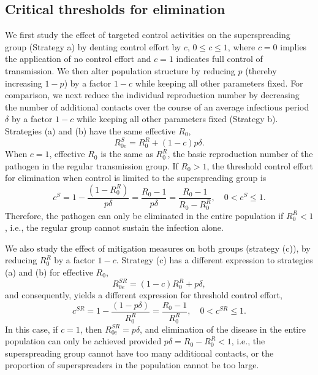 \documentclass{imammb}
\numberwithin{equation}{section}
\begin{document}
\subsection{Critical thresholds for elimination}

We first study the effect of targeted control activities on the superspreading group (Strategy a) by denting control effort by $c$, $0\leq c\leq 1$, where $c=0$ implies the application of no control effort and $c=1$ indicates full control of  transmission. We then alter population structure by reducing $p$ (thereby increasing $1-p$) by a factor $1-c$ while keeping all other parameters fixed. For comparison, we next reduce the individual reproduction number by decreasing the number of additional contacts over the course of an average infectious period $\delta$ by a factor $1-c$ while keeping all other parameters fixed (Strategy b).  Strategies (a) and (b) have the same effective $R_0$,
\begin{equation}\label{eqn:effectiveR0S}
R_{0e}^{S} = R_0^R + (1-c) p \delta.
\end{equation}
When $c=1$, effective $R_0$ is the same as $R_0^R$, the basic reproduction number of the pathogen in the regular transmission group. If $R_0 > 1$, the threshold control effort for elimination when control is limited to the superspreading group is 
\begin{equation}\label{eqn:thresholdS}
c^{S} = 1 -\frac{ (1-R_0^R)}{p \delta}    = \frac{R_0-1}{p \delta} =\frac{R_0-1}{R_0-R_0^R}, \quad 0< c^{S} \leq 1.
\end{equation}
Therefore, the pathogen can only be eliminated in the entire population if $R_0^R < 1$, i.e., the regular group cannot sustain the infection alone. 


We also study the effect of mitigation measures on both groups (strategy (c)), by reducing $R_0^R$ by a factor $1-c$. Strategy (c) has a different expression to strategies (a) and (b) for effective $R_0$,
\begin{equation}\label{eqn:effectiveR0SR}
R_{0e}^{SR} = (1-c) R_0^R + p \delta, 
\end{equation}
and consequently, yields a different expression for threshold control effort,
\begin{equation}\label{eqn:thresholdSR}
c^{SR} = 1 -\frac{ (1-p \delta)}{R_0^R} = \frac{R_0-1}{R_0^R}, \quad 0 < c^{SR} \leq 1.
\end{equation}
In this case, if $c=1$, then $R_{0e}^{SR} = p \delta$, and elimination of the disease in the entire population can only be achieved provided $p \delta = R_0 - R_0^R < 1$, i.e., the superspreading group cannot have too many additional contacts, or the proportion of superspreaders in the population cannot be too large. 
\end{document}
